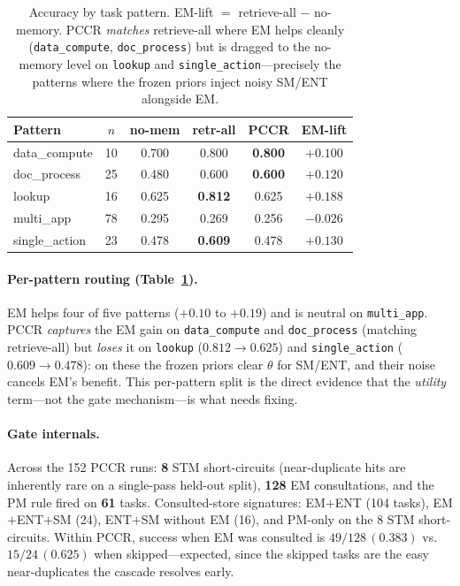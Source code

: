 \documentclass[10pt,twocolumn]{article}
\newcommand{\code}[1]{\texttt{\small #1}}
\begin{document}
\begin{table}[t]
\centering\small
\setlength{\tabcolsep}{5pt}
\begin{tabular}{@{}lccccc@{}}
\toprule
Pattern & $n$ & no-mem & retr-all & PCCR & EM-lift \\
\midrule
data\_compute  & 10 & 0.700 & 0.800 & \textbf{0.800} & $+0.100$ \\
doc\_process   & 25 & 0.480 & 0.600 & \textbf{0.600} & $+0.120$ \\
lookup         & 16 & 0.625 & \textbf{0.812} & 0.625 & $+0.188$ \\
multi\_app     & 78 & 0.295 & 0.269 & 0.256 & $-0.026$ \\
single\_action & 23 & 0.478 & \textbf{0.609} & 0.478 & $+0.130$ \\
\bottomrule
\end{tabular}
\caption{Accuracy by task pattern. EM-lift $=$ retrieve-all $-$ no-memory. PCCR
\emph{matches} retrieve-all where EM helps cleanly (\code{data\_compute},
\code{doc\_process}) but is dragged to the no-memory level on \code{lookup} and
\code{single\_action}---precisely the patterns where the frozen priors inject noisy
SM/ENT alongside EM.}
\label{tab:t1pattern}
\end{table}

\paragraph{Per-pattern routing (Table~\ref{tab:t1pattern}).} EM helps four of five
patterns ($+0.10$ to $+0.19$) and is neutral on \code{multi\_app}. PCCR \emph{captures}
the EM gain on \code{data\_compute} and \code{doc\_process} (matching retrieve-all) but
\emph{loses} it on \code{lookup} ($0.812 \to 0.625$) and \code{single\_action}
($0.609 \to 0.478$): on these the frozen priors clear $\theta$ for SM/ENT, and their
noise cancels EM's benefit. This per-pattern split is the direct evidence that the
\emph{utility} term---not the gate mechanism---is what needs fixing.

\paragraph{Gate internals.} Across the 152 PCCR runs: \textbf{8} STM short-circuits
(near-duplicate hits are inherently rare on a single-pass held-out split), \textbf{128}
EM consultations, and the PM rule fired on \textbf{61} tasks. Consulted-store signatures:
EM$+$ENT (104 tasks), EM$+$ENT$+$SM (24), ENT$+$SM without EM (16), and PM-only on the 8
STM short-circuits. Within PCCR, success when EM was consulted is $49/128\,(0.383)$
vs.\ $15/24\,(0.625)$ when skipped---expected, since the skipped tasks are the easy
near-duplicates the cascade resolves early.
\end{document}
